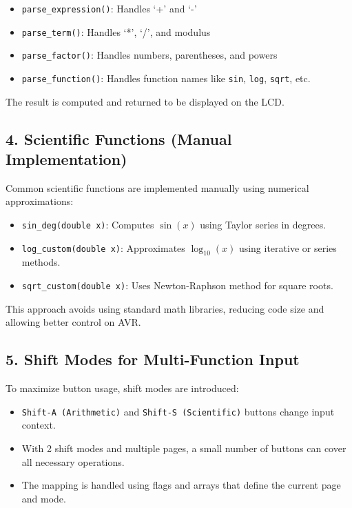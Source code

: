 \documentclass{article}
\theoremstyle{remark}
\begin{document}
\begin{itemize}
    \item \texttt{parse\_expression()}: Handles `+' and `-'
    \item \texttt{parse\_term()}: Handles `*', `/', and modulus
    \item \texttt{parse\_factor()}: Handles numbers, parentheses, and powers
    \item \texttt{parse\_function()}: Handles function names like \texttt{sin}, \texttt{log}, \texttt{sqrt}, etc.
\end{itemize}

The result is computed and returned to be displayed on the LCD.

\subsection{4. Scientific Functions (Manual Implementation)}

Common scientific functions are implemented manually using numerical approximations:

\begin{itemize}
    \item \texttt{sin\_deg(double x)}: Computes $\sin(x)$ using Taylor series in degrees.
    \item \texttt{log\_custom(double x)}: Approximates $\log_{10}(x)$ using iterative or series methods.
    \item \texttt{sqrt\_custom(double x)}: Uses Newton-Raphson method for square roots.
\end{itemize}

This approach avoids using standard math libraries, reducing code size and allowing better control on AVR.

\subsection{5. Shift Modes for Multi-Function Input}

To maximize button usage, shift modes are introduced:

\begin{itemize}
    \item \texttt{Shift-A (Arithmetic)} and \texttt{Shift-S (Scientific)} buttons change input context.
    \item With 2 shift modes and multiple pages, a small number of buttons can cover all necessary operations.
    \item The mapping is handled using flags and arrays that define the current page and mode.
\end{itemize}
\end{document}
